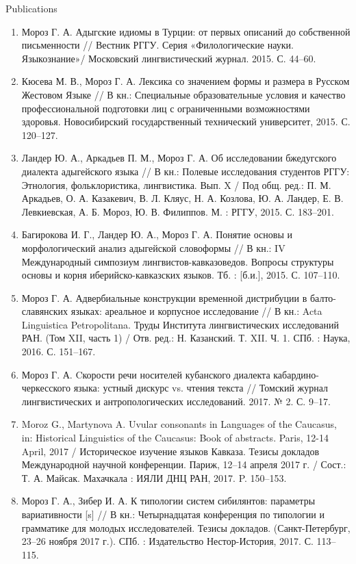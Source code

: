 \documentclass{resume} %
\begin{document}
\begin{rSection}{Publications}
\begin{enumerate}
\item Мороз Г. А. Адыгские идиомы в Турции: от первых описаний до собственной письменности // Вестник РГГУ. Серия «Филологические науки. Языкознание»/ Московский лингвистический журнал. 2015. С. 44--60.
\item Кюсева М. В., Мороз Г. А. Лексика со значением формы и размера в Русском Жестовом Языке // В кн.: Специальные образовательные условия и качество профессиональной подготовки лиц с ограниченными возможностями здоровья. Новосибирский государственный технический университет, 2015. С. 120--127.
\item Ландер Ю. А., Аркадьев П. М., Мороз Г. А. Об исследовании бжедугского диалекта адыгейского языка // В кн.: Полевые исследования студентов РГГУ: Этнология, фольклористика, лингвистика. Вып. X / Под общ. ред.: П. М. Аркадьев, О. А. Казакевич, В. Л. Кляус, Н. А. Козлова, Ю. А. Ландер, Е. В. Левкиевская, А. Б. Мороз, Ю. В. Филиппов. М. : РГГУ, 2015. С. 183--201.
\item Багирокова И. Г., Ландер Ю. А., Мороз Г. А. Понятие основы и морфологический анализ адыгейской словоформы // В кн.: IV Международный симпозиум лингвистов-кавказоведов. Вопросы структуры основы и корня иберийско-кавказских языков. Тб. : [б.и.], 2015. С. 107--110.
\item Мороз Г. А. Адвербиальные конструкции временной дистрибуции в балто-славянских языках: ареальное и корпусное исследование // В кн.: Acta Linguistica Petropolitana. Труды Института лингвистических исследований РАН. (Том XII, часть 1) / Отв. ред.: Н. Казанский. Т. XII. Ч. 1. СПб. : Наука, 2016. С. 151--167.
\item Мороз Г. А. Cкорости речи носителей кубанского диалекта кабардино-черкесского языка: устный дискурс vs. чтения текста // Томский журнал лингвистических и антропологических исследований. 2017. №  2. С. 9--17.
\item Moroz G., Martynova A. Uvular consonants in Languages of the Caucasus, in: Historical Linguistics of the Caucasus: Book of abstracts. Paris, 12-14 April, 2017 / Историческое изучение языков Кавказа. Тезисы докладов Международной научной конференции. Париж, 12--14 апреля 2017 г. / Сост.: Т. А. Майсак. Махачкала : ИЯЛИ ДНЦ РАН, 2017. P. 150--153.
\item Мороз Г. А., Зибер И. А. К типологии систем сибилянтов: параметры вариативности [s] // В кн.: Четырнадцатая конференция по типологии и грамматике для молодых исследователей. Тезисы докладов. (Санкт-Петербург, 23--26 ноября 2017 г.). СПб. : Издательство Нестор-История, 2017. С. 113--115.

\end{enumerate}
\end{rSection}
\end{document}
